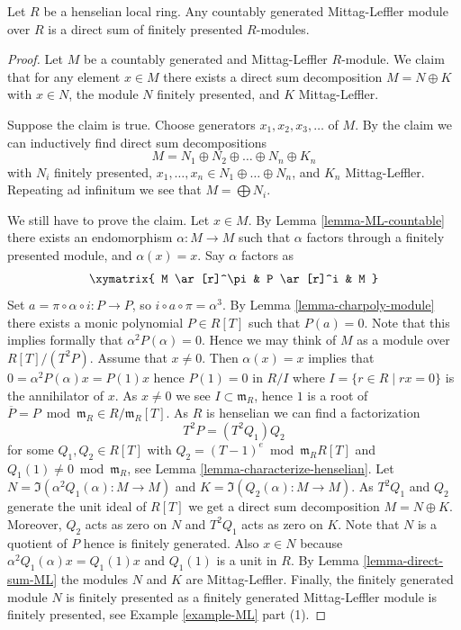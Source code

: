 \begin{lemma}
\label{lemma-split-ML-henselian}
Let $R$ be a henselian local ring.
Any countably generated Mittag-Leffler module over $R$ is a direct
sum of finitely presented $R$-modules.
\end{lemma}

\begin{proof}
Let $M$ be a countably generated and Mittag-Leffler $R$-module.
We claim that for any element $x \in M$ there exists a direct
sum decomposition $M = N \oplus K$ with $x \in N$, the module
$N$ finitely presented, and $K$ Mittag-Leffler.

\medskip\noindent
Suppose the claim is true. Choose generators $x_1, x_2, x_3, \ldots$
of $M$. By the claim we can inductively find direct sum decompositions
$$
M = N_1 \oplus N_2 \oplus \ldots \oplus N_n \oplus K_n
$$
with $N_i$ finitely presented,
$x_1, \ldots, x_n \in N_1 \oplus \ldots \oplus N_n$, and $K_n$ Mittag-Leffler.
Repeating ad infinitum we see that $M = \bigoplus N_i$.

\medskip\noindent
We still have to prove the claim. Let $x \in M$. By
Lemma \ref{lemma-ML-countable}
there exists an endomorphism $\alpha : M \to M$
such that $\alpha$ factors through a finitely presented module, and
$\alpha (x) = x$. Say $\alpha$ factors as
$$
\xymatrix{
M \ar[r]^\pi & P \ar[r]^i & M
}
$$
Set $a = \pi \circ \alpha \circ i : P \to P$, so
$i \circ a \circ \pi = \alpha^3$. By
Lemma \ref{lemma-charpoly-module}
there exists a monic polynomial $P \in R[T]$ such that $P(a) = 0$.
Note that this implies formally that $\alpha^2 P(\alpha) = 0$.
Hence we may think of $M$ as a module over $R[T]/(T^2P)$.
Assume that $x \not = 0$. Then $\alpha(x) = x$ implies that
$0 = \alpha^2P(\alpha)x = P(1)x$ hence $P(1) = 0$ in $R/I$ where
$I = \{r \in R \mid rx = 0\}$ is the annihilator of $x$.
As $x \not = 0$ we see $I \subset \mathfrak m_R$, hence
$1$ is a root of $\overline{P} = P \bmod \mathfrak m_R \in R/\mathfrak m_R[T]$.
As $R$ is henselian we can find a factorization
$$
T^2P = (T^2 Q_1) Q_2
$$
for some $Q_1, Q_2 \in R[T]$ with
$Q_2 = (T - 1)^e \bmod \mathfrak m_R R[T]$ and
$Q_1(1) \not = 0 \bmod \mathfrak m_R$, see
Lemma \ref{lemma-characterize-henselian}.
Let $N = \Im(\alpha^2Q_1(\alpha) : M \to M)$ and
$K = \Im(Q_2(\alpha) : M \to M)$. As $T^2Q_1$ and
$Q_2$ generate the unit ideal of $R[T]$ we get a direct sum
decomposition $M = N \oplus K$. Moreover, $Q_2$ acts as zero on $N$ and
$T^2Q_1$ acts as zero on $K$. Note that $N$ is a quotient of $P$
hence is finitely generated. Also $x \in N$ because
$\alpha^2Q_1(\alpha)x = Q_1(1)x$ and $Q_1(1)$ is a unit in $R$. By
Lemma \ref{lemma-direct-sum-ML}
the modules $N$ and $K$ are Mittag-Leffler. Finally, the finitely generated
module $N$ is finitely presented as a finitely generated Mittag-Leffler
module is finitely presented, see
Example \ref{example-ML} part (1).
\end{proof}